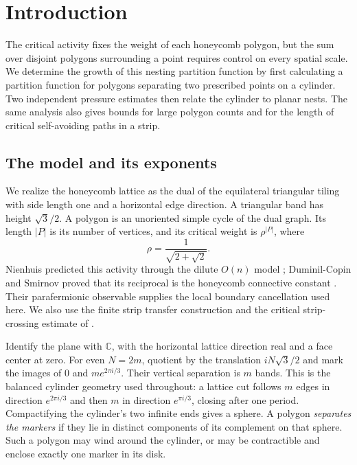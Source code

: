 \section{Introduction}\label{sec:E-introduction}

The critical activity fixes the weight of each honeycomb polygon, but
the sum over disjoint polygons surrounding a point requires control
on every spatial scale. We determine
the growth of this nesting partition function by first calculating a
partition function for polygons separating two prescribed points on a
cylinder. Two independent pressure estimates then relate the cylinder
to planar nests. The same analysis also gives bounds for large polygon
counts and for the length of critical self-avoiding paths in a strip.

\subsection{The model and its exponents}

We realize the honeycomb lattice as the dual of the equilateral
triangular tiling with side length one and a horizontal edge direction.
A triangular band has height $\sqrt3/2$. A polygon is an unoriented
simple cycle of the dual graph. Its length $|P|$ is its number of
vertices, and its critical weight is $\rho^{|P|}$, where
\[
 \rho=\frac1{\sqrt{2+\sqrt2}}.
\]
Nienhuis predicted this activity through the dilute $O(n)$ model
\cite{Nienhuis1982}; Duminil-Copin and Smirnov proved that its
reciprocal is the honeycomb connective constant \cite{DCS2012}.
Their parafermionic observable supplies the local boundary cancellation
used here. We also use the finite strip transfer construction and the
critical strip-crossing estimate of \cite{StripCompanion}.

Identify the plane with $\mathbb C$, with the horizontal lattice
direction real and a face center at zero. For even $N=2m$, quotient by
the translation $iN\sqrt3/2$ and mark the images of $0$ and
$m e^{2\pi i/3}$.
Their vertical separation is $m$ bands. This is the balanced cylinder
geometry used throughout: a lattice cut follows $m$ edges in direction
$e^{2\pi i/3}$ and then $m$ in direction $e^{\pi i/3}$, closing after
one period. Compactifying the cylinder's two infinite ends gives a
sphere. A polygon \emph{separates the markers} if they lie in distinct
components of its complement on that sphere. Such a polygon may wind
around the cylinder, or may be contractible and enclose exactly one
marker in its disk.

